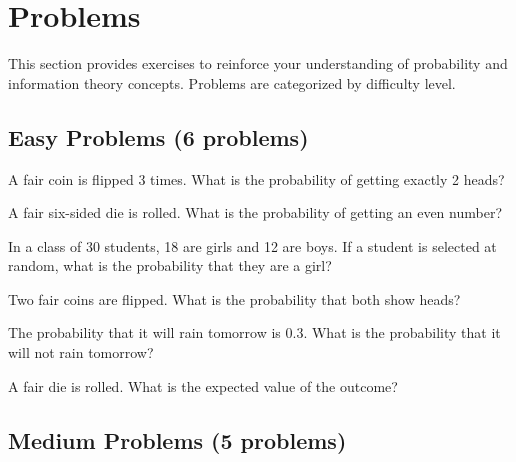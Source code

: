 
\section{Problems }
\label{sec:probability-problems}

This section provides exercises to reinforce your understanding of probability and information theory concepts. Problems are categorized by difficulty level.

\subsection{Easy Problems (6 problems)}

\begin{problem}
A fair coin is flipped 3 times. What is the probability of getting exactly 2 heads?
\end{problem}

\begin{problem}
A fair six-sided die is rolled. What is the probability of getting an even number?
\end{problem}

\begin{problem}
In a class of 30 students, 18 are girls and 12 are boys. If a student is selected at random, what is the probability that they are a girl?
\end{problem}

\begin{problem}
Two fair coins are flipped. What is the probability that both show heads?
\end{problem}

\begin{problem}
The probability that it will rain tomorrow is 0.3. What is the probability that it will not rain tomorrow?
\end{problem}

\begin{problem}
A fair die is rolled. What is the expected value of the outcome?
\end{problem}

\subsection{Medium Problems (5 problems)}

